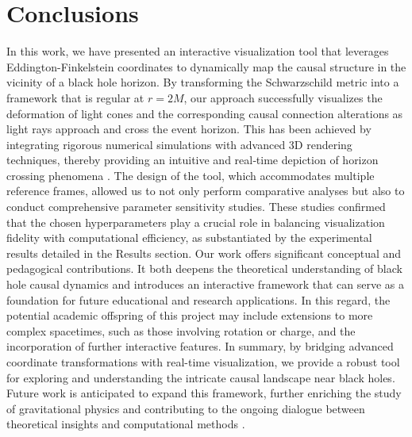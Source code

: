 \documentclass{article}
\begin{document}
\section{Conclusions} In this work, we have presented an interactive visualization tool that leverages Eddington-Finkelstein coordinates to dynamically map the causal structure in the vicinity of a black hole horizon. By transforming the Schwarzschild metric into a framework that is regular at $r=2M$, our approach successfully visualizes the deformation of light cones and the corresponding causal connection alterations as light rays approach and cross the event horizon. This has been achieved by integrating rigorous numerical simulations with advanced 3D rendering techniques, thereby providing an intuitive and real‐time depiction of horizon crossing phenomena \cite{Einstein1916, Hawking1973, Penrose1965, Misner1973}.  The design of the tool, which accommodates multiple reference frames, allowed us to not only perform comparative analyses but also to conduct comprehensive parameter sensitivity studies. These studies confirmed that the chosen hyperparameters play a crucial role in balancing visualization fidelity with computational efficiency, as substantiated by the experimental results detailed in the Results section.  Our work offers significant conceptual and pedagogical contributions. It both deepens the theoretical understanding of black hole causal dynamics and introduces an interactive framework that can serve as a foundation for future educational and research applications. In this regard, the potential academic offspring of this project may include extensions to more complex spacetimes, such as those involving rotation or charge, and the incorporation of further interactive features.  In summary, by bridging advanced coordinate transformations with real-time visualization, we provide a robust tool for exploring and understanding the intricate causal landscape near black holes. Future work is anticipated to expand this framework, further enriching the study of gravitational physics and contributing to the ongoing dialogue between theoretical insights and computational methods \cite{Einstein1916, Hawking1973, Penrose1965, Misner1973}.
\end{document}
